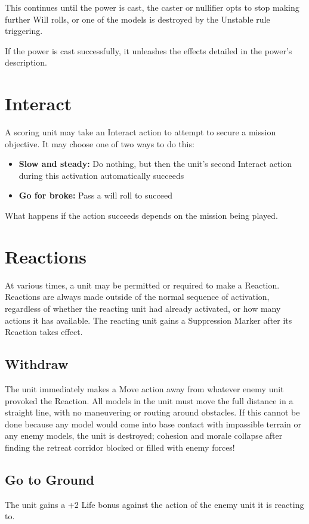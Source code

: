 \begin{multicols}{2}
This continues until the power is cast, the caster or nullifier opts to stop making further Will rolls, or one of the models is destroyed by the Unstable rule triggering.

If the power is cast successfully, it unleashes the effects detailed in the power's description.




\section*{Interact}
A scoring unit may take an Interact action to attempt to secure a mission objective. It may choose one of two ways to do this:
\begin{itemize}
    \item \textbf{Slow and steady:} Do nothing, but then the unit's second Interact action during this activation automatically succeeds
    \item \textbf{Go for broke:} Pass a will roll to succeed
\end{itemize}

What happens if the action succeeds depends on the mission being played.




\section*{Reactions}
At various times, a unit may be permitted or required to make a Reaction. Reactions are always made outside of the normal sequence of activation, regardless of whether the reacting unit had already activated, or how many actions it has available. The reacting unit gains a Suppression Marker after its Reaction takes effect.



\subsection*{Withdraw}
The unit immediately makes a Move action away from whatever enemy unit provoked the Reaction. All models in the unit must move the full distance in a straight line, with no maneuvering or routing around obstacles. If this cannot be done because any model would come into base contact with impassible terrain or any enemy models, the unit is destroyed; cohesion and morale collapse after finding the retreat corridor blocked or filled with enemy forces!



\subsection*{Go to Ground}
The unit gains a +2 Life bonus against the action of the enemy unit it is reacting to.




\end{multicols}

